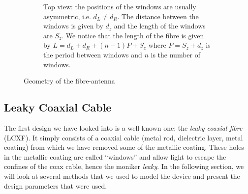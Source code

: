 \begin{figure}
  \vspace{2cm}
  
  \begin{subfigure}[b]{\textwidth}
    \centering
   \vspace{0.25cm}
   \caption{Top view: the positions of the windows are usually asymmetric, i.e. $d_L\neq d_R$. The distance between
	    the windows is given by $d_z$ and the length of the windows are $S_z$. We notice that the length of the 
	    fibre is given by $L=d_L+d_R+(n-1)P+S_z$ where $P=S_z+d_z$ is the period between windows and $n$ is the number
	    of windows.}
   \label{fig:antenna.fibre-antenna.topview}
  \end{subfigure}
  \caption{Geometry of the fibre-antenna}
  \label{fig:antenna.fibre-antenna}
\end{figure}

\subsection{Leaky Coaxial Cable}
The first design we have looked into is a well known one:
the \textit{leaky coaxial fibre} (LCXF). It simply consists of
a coaxial cable (metal rod, dielectric layer, metal coating)
from which we have removed some of the metallic coating. 
These holes in the metallic coating are called ``windows'' and
allow light to escape the confines of the coax cable, hence
the moniker \textit{leaky}. In the following section, we will
look at several methods that we used to model the device
and present the design parameters that were used. 

